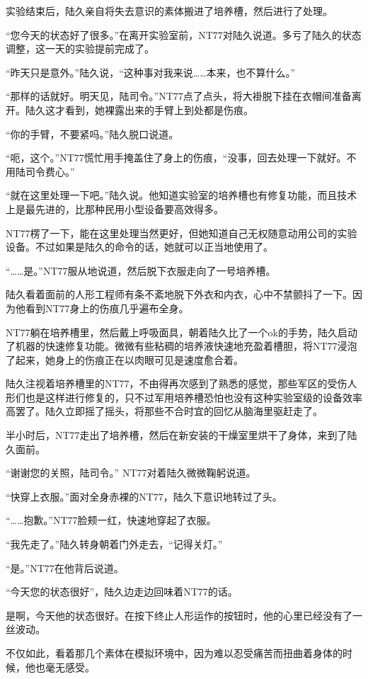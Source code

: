 实验结束后，陆久亲自将失去意识的素体搬进了培养槽，然后进行了处理。

“您今天的状态好了很多。”在离开实验室前，NT77对陆久说道。多亏了陆久的状态调整，这一天的实验提前完成了。

“昨天只是意外。”陆久说，“这种事对我来说……本来，也不算什么。”

“那样的话就好。明天见，陆司令。”NT77点了点头，将大褂脱下挂在衣帽间准备离开。陆久这才看到，她裸露出来的手臂上到处都是伤痕。

“你的手臂，不要紧吗。”陆久脱口说道。

“呃，这个。”NT77慌忙用手掩盖住了身上的伤痕，“没事，回去处理一下就好。不用陆司令费心。”

“就在这里处理一下吧。”陆久说。他知道实验室的培养槽也有修复功能，而且技术上是最先进的，比那种民用小型设备要高效得多。

NT77楞了一下，能在这里处理当然更好，但她知道自己无权随意动用公司的实验设备。不过如果是陆久的命令的话，她就可以正当地使用了。

“……是。”NT77服从地说道，然后脱下衣服走向了一号培养槽。

陆久看着面前的人形工程师有条不紊地脱下外衣和内衣，心中不禁颤抖了一下。因为他看到NT77身上的伤痕几乎遍布全身。

NT77躺在培养槽里，然后戴上呼吸面具，朝着陆久比了一个ok的手势，陆久启动了机器的快速修复功能。微微有些粘稠的培养液快速地充盈着槽胆，将NT77浸泡了起来，她身上的伤痕正在以肉眼可见是速度愈合着。

陆久注视着培养槽里的NT77，不由得再次感到了熟悉的感觉，那些军区的受伤人形们也是这样进行修复的，只不过军用培养槽恐怕也没有这种实验室级的设备效率高罢了。陆久立即摇了摇头，将那些不合时宜的回忆从脑海里驱赶走了。

半小时后，NT77走出了培养槽，然后在新安装的干燥室里烘干了身体，来到了陆久面前。

“谢谢您的关照，陆司令。” NT77对着陆久微微鞠躬说道。

“快穿上衣服。”面对全身赤裸的NT77，陆久下意识地转过了头。

“……抱歉。”NT77脸颊一红，快速地穿起了衣服。

“我先走了。”陆久转身朝着门外走去，“记得关灯。”

“是。”NT77在他背后说道。

“今天您的状态很好”，陆久边走边回味着NT77的话。

是啊，今天他的状态很好。在按下终止人形运作的按钮时，他的心里已经没有了一丝波动。

不仅如此，看着那几个素体在模拟环境中，因为难以忍受痛苦而扭曲着身体的时候，他也毫无感受。

